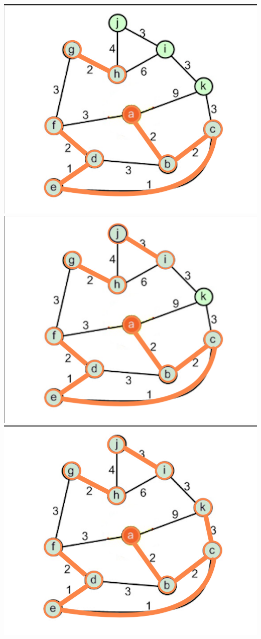 \documentclass[a4paper]{exam}
\begin{document}
\begin{questions}
\begin{parts}
\begin{solution}
    \includegraphics[scale=0.25]{Q3/images3e/3e7}
    \includegraphics[scale=0.2]{Q3/images3e/3e8}
    \includegraphics[scale=0.25]{Q3/images3e/3e9}\\

\end{solution}
\end{parts}
\end{questions}
\end{document}
